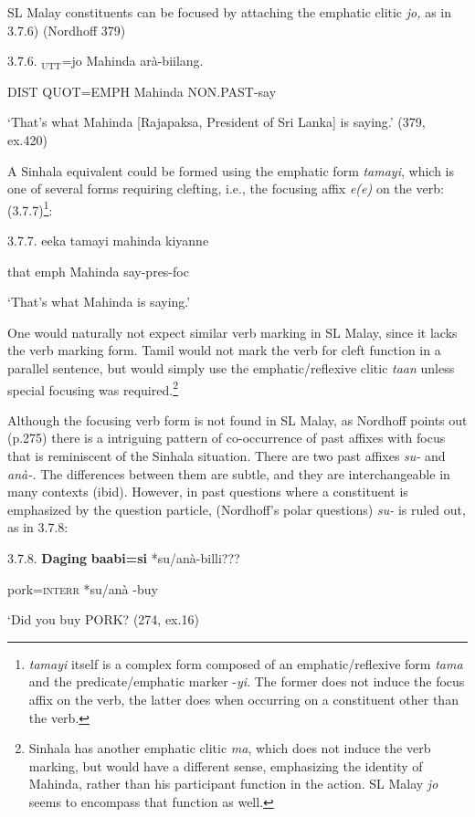 \documentclass[letterpaper]{article}
\newcommand\textsubscript[1]{\ensuremath{{}_{\text{#1}}}}
\begin{document}
SL Malay constituents can be focused by attaching the emphatic clitic \textit{jo,} as in 3.7.6)  (Nordhoff 379)

 3.7.6. 
\ea
{}\textsubscript{UTT}=jo Mahinda arà-biilang.

  DIST QUOT=EMPH Mahinda NON.PAST-say

   `That's what Mahinda [Rajapaksa, President of Sri Lanka] is saying.'  (379, ex.420)

A Sinhala equivalent could be formed using the emphatic form \textit{tamayi}, which is one of several forms requiring clefting, i.e., the focusing affix \textit{e(e)} on the verb:(3.7.7)\footnote{\textit{tamayi}
  itself is a complex form composed of an emphatic/reflexive form \textit{tama} and the predicate/emphatic marker -\textit{yi}. The former does not induce the focus affix on the verb, the latter does when occurring on a constituent other than the verb.}:

 3.7.7. 
\ea
\gll  eeka tamayi mahinda kiyanne

  that emph Mahinda say-pres-foc

  `That's what Mahinda is saying.'

 One would naturally not expect similar verb marking in SL Malay, since it lacks the verb marking form. Tamil would not mark the verb for cleft function in a parallel sentence, but would simply use the emphatic/reflexive clitic \textit{taan} unless special focusing was required.\footnote{Sinhala
  has another emphatic clitic \textit{ma}, which does not induce the verb marking, but would have a different sense, emphasizing the identity of Mahinda, rather than his participant function in the action. SL Malay \textit{jo} seems to encompass that function as well.} 

 Although the focusing verb form is not found in SL Malay, as Nordhoff points out (p.275) there is a intriguing pattern of co-occurrence of past affixes with focus that is reminiscent of the Sinhala situation. There are two past affixes \textit{su-} and \textit{anà-.} The differences between them are subtle, and they are interchangeable in many contexts (ibid). However, in past questions where a constituent is emphasized by the question particle, (Nordhoff's polar questions) \textit{su-} is ruled out, as in 3.7.8: 

 3.7.8.
\ea
\gll  \textbf{Daging} \textbf{baabi=si} *su/anà-billi???

  pork=\textsc{interr} *su/anà -buy

  `Did you buy PORK? (274, ex.16)
\end{document}
